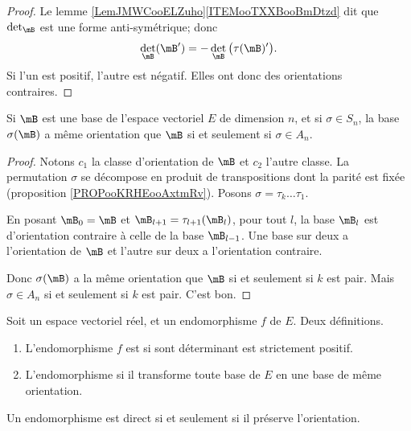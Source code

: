 \begin{proof}
	Le lemme \ref{LemJMWCooELZuho}\ref{ITEMooTXXBooBmDtzd} dit que \( \det_{\mB}\) est une forme anti-symétrique; donc
	\begin{equation}
		\det_{\mB}(\mB')=-\det_{\mB}\big( \tau(\mB)' \big).
	\end{equation}
	Si l'un est positif, l'autre est négatif. Elles ont donc des orientations contraires.
\end{proof}

\begin{corollary}
	Si \( \mB\) est une base de l'espace vectoriel \( E\) de dimension \( n\), et si \( \sigma\in S_n\), la base \( \sigma(\mB)\) a même orientation que \( \mB\) si et seulement si \( \sigma\in A_n\).
\end{corollary}

\begin{proof}
	Notons \( c_1\) la classe d'orientation de \( \mB\) et \( c_2\) l'autre classe. La permutation \( \sigma\) se décompose en produit de transpositions dont la parité est fixée (proposition \ref{PROPooKRHEooAxtmRv}). Posons \( \sigma=\tau_k\ldots \tau_1\).

	En posant \( \mB_0=\mB\) et \( \mB_{l+1}=\tau_{l+1}(\mB_l)\), pour tout \( l\), la base \( \mB_l\) est d'orientation contraire à celle de la base \( \mB_{l-1}\). Une base sur deux a l'orientation de \( \mB\) et l'autre sur deux a l'orientation contraire.

	Donc \( \sigma(\mB)\) a la même orientation que \( \mB\) si et seulement si \( k\) est pair. Mais \( \sigma\in A_n\) si et seulement si \( k\) est pair. C'est bon.
\end{proof}

\begin{propositionDef}        \label{PROPooNBAXooKNUrnk}
	Soit un espace vectoriel réel, et un endomorphisme \( f\) de \( E\). Deux définitions.
	\begin{enumerate}
		\item       \label{ITEMooOAXFooLIPHlW}
		      L'endomorphisme \( f\) est  si sont déterminant est strictement positif.
		\item       \label{ITEMooNKYCooXTgKJA}
		      L'endomorphisme  si il transforme toute base de \( E\) en une base de même orientation.
	\end{enumerate}
	Un endomorphisme est direct si et seulement si il préserve l'orientation.
\end{propositionDef}

